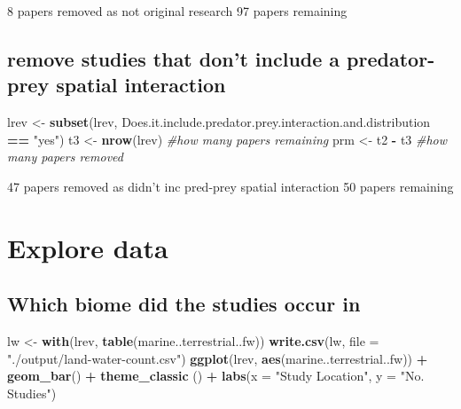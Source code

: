 \documentclass[
]{article}
\newenvironment{Shaded}{\begin{snugshade}}{\end{snugshade}}
\newcommand{\CommentTok}[1]{\textcolor[rgb]{0.56,0.35,0.01}{\textit{#1}}}
\newcommand{\DataTypeTok}[1]{\textcolor[rgb]{0.13,0.29,0.53}{#1}}
\newcommand{\KeywordTok}[1]{\textcolor[rgb]{0.13,0.29,0.53}{\textbf{#1}}}
\newcommand{\NormalTok}[1]{#1}
\newcommand{\OperatorTok}[1]{\textcolor[rgb]{0.81,0.36,0.00}{\textbf{#1}}}
\newcommand{\StringTok}[1]{\textcolor[rgb]{0.31,0.60,0.02}{#1}}
\begin{document}
8 papers removed as not original research 97 papers remaining

\hypertarget{remove-studies-that-dont-include-a-predator-prey-spatial-interaction}{%
\subsection{remove studies that don't include a predator-prey spatial
interaction}\label{remove-studies-that-dont-include-a-predator-prey-spatial-interaction}}

\begin{Shaded}
\begin{Highlighting}[]
\NormalTok{lrev <-}\StringTok{ }\KeywordTok{subset}\NormalTok{(lrev, Does.it.include.predator.prey.interaction.and.distribution }\OperatorTok{==}\StringTok{ "yes"}\NormalTok{)}
\NormalTok{t3 <-}\StringTok{ }\KeywordTok{nrow}\NormalTok{(lrev) }\CommentTok{#how many papers remaining}
\NormalTok{prm <-}\StringTok{ }\NormalTok{t2 }\OperatorTok{-}\StringTok{ }\NormalTok{t3 }\CommentTok{#how many papers removed}
\end{Highlighting}
\end{Shaded}

47 papers removed as didn't inc pred-prey spatial interaction 50 papers
remaining

\hypertarget{explore-data}{%
\section{Explore data}\label{explore-data}}

\hypertarget{which-biome-did-the-studies-occur-in}{%
\subsection{Which biome did the studies occur
in}\label{which-biome-did-the-studies-occur-in}}

\begin{Shaded}
\begin{Highlighting}[]
\NormalTok{lw <-}\StringTok{ }\KeywordTok{with}\NormalTok{(lrev, }\KeywordTok{table}\NormalTok{(marine..terrestrial..fw))}
\KeywordTok{write.csv}\NormalTok{(lw, }\DataTypeTok{file =} \StringTok{"./output/land-water-count.csv"}\NormalTok{)}
\KeywordTok{ggplot}\NormalTok{(lrev, }\KeywordTok{aes}\NormalTok{(marine..terrestrial..fw)) }\OperatorTok{+}\StringTok{ }\KeywordTok{geom_bar}\NormalTok{() }\OperatorTok{+}\StringTok{ }\KeywordTok{theme_classic}\NormalTok{ () }\OperatorTok{+}\StringTok{ }\KeywordTok{labs}\NormalTok{(}\DataTypeTok{x =} \StringTok{"Study Location"}\NormalTok{, }\DataTypeTok{y =} \StringTok{"No. Studies"}\NormalTok{)}
\end{Highlighting}
\end{Shaded}
\end{document}
